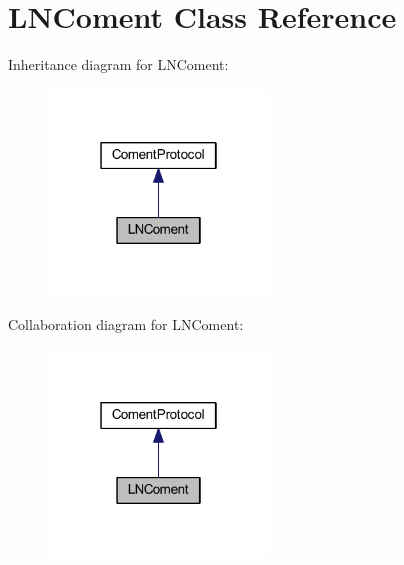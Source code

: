\hypertarget{class_l_n_coment}{\section{L\-N\-Coment Class Reference}
\label{class_l_n_coment}
}


Inheritance diagram for L\-N\-Coment\-:\nopagebreak
\begin{figure}[H]
\begin{center}
\leavevmode
\includegraphics[width=166pt]{class_l_n_coment__inherit__graph}
\end{center}
\end{figure}


Collaboration diagram for L\-N\-Coment\-:\nopagebreak
\begin{figure}[H]
\begin{center}
\leavevmode
\includegraphics[width=166pt]{class_l_n_coment__coll__graph}
\end{center}
\end{figure}
